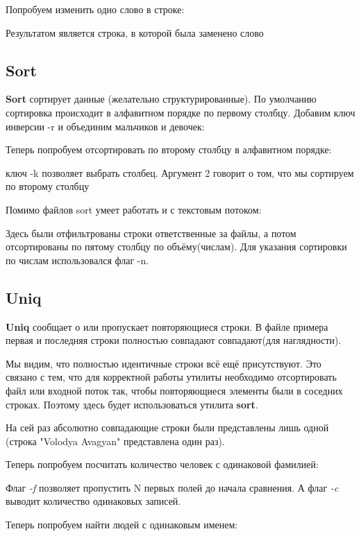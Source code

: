 \documentclass[a4paper]{article}
\begin{document}
Попробуем изменить одно слово в строке:

Результатом является строка, в которой была заменено слово

\subsection{Sort}
\textbf{Sort} сортирует данные (желательно структурированные). По умолчанию сортировка происходит в алфавитном порядке по первому столбцу.
Добавим ключ инверсии -r и объединим мальчиков и девочек:


Теперь попробуем отсортировать по второму столбцу в алфавитном порядке:

ключ -k позволяет выбрать столбец. Аргумент 2 говорит о том, что мы сортируем по второму столбцу

Помимо файлов sort умеет работать и с текстовым потоком:

Здесь были отфильтрованы строки ответственные за файлы, а потом отсортированы по пятому столбцу по объёму(числам). Для указания сортировки по числам использовался флаг -n.
\subsection{Uniq} 
\textbf{Uniq} сообщает о или пропускает повторяющиеся строки. В файле примера первая и последняя строки полностью совпадают совпадают(для наглядности).



Мы видим, что полностью идентичные строки всё ещё присутствуют. Это связано с тем, что для корректной работы утилиты необходимо отсортировать файл или входной поток так, чтобы повторяющиеся элементы были в соседних строках. Поэтому здесь будет использоваться утилита \textbf{sort}.



На сей раз абсолютно совпадающие строки были представлены лишь одной (строка "Volodya Avagyan" представлена один раз).

Теперь попробуем посчитать количество человек с одинаковой фамилией:



Флаг \textit{-f} позволяет пропустить N первых полей до начала сравнения. А флаг \textit{-c} выводит количество одинаковых записей.

Теперь попробуем найти людей с одинаковым именем:
\end{document}
